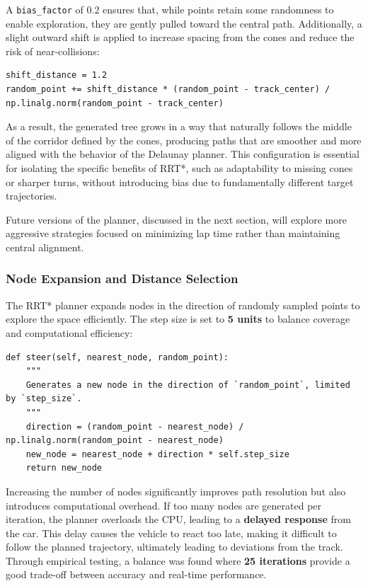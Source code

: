 \documentclass[a4paper,11pt]{report}
\begin{document}
A \texttt{bias\_factor} of 0.2 ensures that, while points retain some randomness to enable exploration, they are gently pulled toward the central path. Additionally, a slight outward shift is applied to increase spacing from the cones and reduce the risk of near-collisions:

\begin{verbatim}
shift_distance = 1.2
random_point += shift_distance * (random_point - track_center) / np.linalg.norm(random_point - track_center)
\end{verbatim}

As a result, the generated tree grows in a way that naturally follows the middle of the corridor defined by the cones, producing paths that are smoother and more aligned with the behavior of the Delaunay planner. This configuration is essential for isolating the specific benefits of RRT*, such as adaptability to missing cones or sharper turns, without introducing bias due to fundamentally different target trajectories.

Future versions of the planner, discussed in the next section, will explore more aggressive strategies focused on minimizing lap time rather than maintaining central alignment.


\subsubsection{Node Expansion and Distance Selection}
The RRT* planner expands nodes in the direction of randomly sampled points to explore the space efficiently. The step size is set to \textbf{5 units} to balance coverage and computational efficiency:

\begin{verbatim}
def steer(self, nearest_node, random_point):
    """
    Generates a new node in the direction of `random_point`, limited by `step_size`.
    """
    direction = (random_point - nearest_node) / np.linalg.norm(random_point - nearest_node)
    new_node = nearest_node + direction * self.step_size
    return new_node
\end{verbatim}

Increasing the number of nodes significantly improves path resolution but also introduces computational overhead. If too many nodes are generated per iteration, the planner overloads the CPU, leading to a \textbf{delayed response} from the car. This delay causes the vehicle to react too late, making it difficult to follow the planned trajectory, ultimately leading to deviations from the track. Through empirical testing, a balance was found where \textbf{25 iterations} provide a good trade-off between accuracy and real-time performance.
\end{document}
